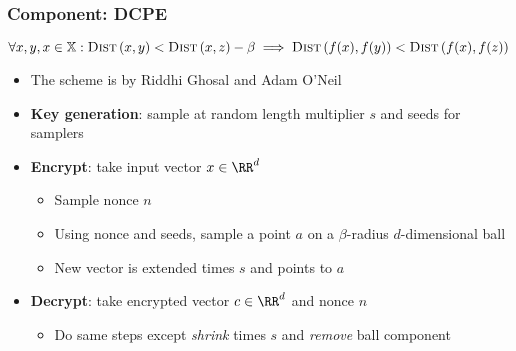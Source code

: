 	\begin{frame}[label={frame:appendix:dcpe}]

		\frametitle{Component: DCPE}

		\[
			\forall x, y, x \in \mathbb{X} : \algo{Dist}{x, y} < \algo{Dist}{x, z} - \beta \implies \algo{Dist}{f(x), f(y)} < \algo{Dist}{f(x), f(z)}
		\]

		\begin{itemize}
			\item<1->
				The scheme is by Riddhi Ghosal and Adam O'Neil \cite{dcpe}
			\item<2->
				\textbf{Key generation}: sample at random length multiplier $s$ and seeds for samplers
			\item<3->
				\textbf{Encrypt}: take input vector $x \in \RR^d$
				\begin{itemize}
					\item Sample nonce $n$
					\item Using nonce and seeds, sample a point $a$ on a $\beta$-radius $d$-dimensional ball
					\item New vector is extended times $s$ and points to $a$
				\end{itemize}
			\item<4->
				\textbf{Decrypt}: take encrypted vector $c \in \RR^d$ and nonce $n$
				\begin{itemize}
					\item Do same steps except \emph{shrink} times $s$ and \emph{remove} ball component
				\end{itemize}
		\end{itemize}

		\hyperlink{frame:knn}{}

	\end{frame}

